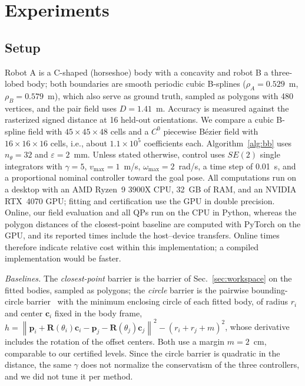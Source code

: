 \documentclass[journal]{IEEEtran}
\theoremstyle{definition}
\newcommand{\norm}[1]{\left\lVert #1\right\rVert}
\newcommand{\Rot}{\mathbf{R}}
\begin{document}
\section{Experiments}\label{sec:exp}

\subsection{Setup}
Robot A is a C-shaped (horseshoe) body with a concavity and robot B a three-lobed body; both
boundaries are smooth periodic cubic B-splines ($\rho_A=0.529$~m, $\rho_B=0.579$~m), which also
serve as ground truth, sampled as polygons with 480 vertices, and the pair field uses $D=1.41$~m. Accuracy is measured against the rasterized signed distance at 16 held-out
orientations. We compare a cubic B-spline field with $45\times45\times48$ cells and a $C^0$ piecewise
B\'ezier field with $16\times16\times16$ cells, i.e., about $1.1\times10^5$ coefficients each.
Algorithm~\ref{alg:bb} uses $n_\theta=32$ and $\varepsilon=2$~mm. Unless stated otherwise, control
uses $SE(2)$ single integrators with $\gamma=5$, $v_{\max}=1$~m/s, $\omega_{\max}=2$~rad/s, a time
step of 0.01~s, and a proportional nominal controller toward the goal pose. All computations run on
a desktop with an AMD Ryzen~9 3900X CPU, 32~GB of RAM, and an NVIDIA RTX~4070 GPU; fitting and
certification use the GPU in double precision. Online, our field evaluation and all QPs run on the
CPU in Python, whereas the polygon distances of the closest-point baseline are computed with PyTorch
on the GPU, and its reported times include the host--device transfers. Online times therefore
indicate relative cost within this implementation; a compiled implementation would be faster.

\emph{Baselines.} The \emph{closest-point} barrier is the barrier of Sec.~\ref{sec:workspace} on the
fitted bodies, sampled as polygons; the \emph{circle} barrier is the pairwise bounding-circle
barrier~\cite{wang2017safety} with the minimum enclosing circle of each fitted body, of radius $r_i$
and center $\mathbf c_i$ fixed in the body frame,
$h=\norm{\mathbf p_i+\Rot(\theta_i)\mathbf c_i-\mathbf p_j-\Rot(\theta_j)\mathbf c_j}^2-(r_i+r_j+m)^2$,
whose derivative includes the rotation of the offset centers. Both use a margin $m=2$~cm, comparable
to our certified levels. Since the circle barrier is quadratic in the
distance, the same $\gamma$ does not normalize the conservatism of the three controllers, and we did
not tune it per method.
\end{document}
